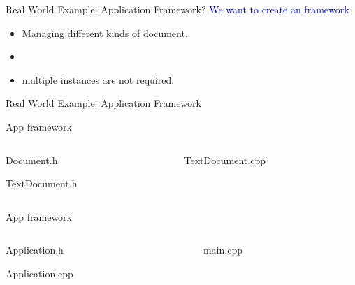 \documentclass[13pt]{beamer}
\begin{document}
\begin{frame}{Real World Example: Application Framework?}
	\textcolor{blue}{We want to create an framework}	
	\begin{itemize}
		\setlength\itemsep{1em}
		\item Managing different kinds of document.
		\item 
		\item multiple instances are not required.
	\end{itemize}
\end{frame}

\begin{frame}{Real World Example: Application Framework}
\begin{center}
\end{center}
\end{frame}

\begin{frame}{App framework}
\begin{columns}[T]
\begin{column}{.45\textwidth}
\lstset{basicstyle=\tiny,style=myCustomCppStyle}
Document.h

TextDocument.h

\end{column}

\begin{column}{.45\textwidth}
\lstset{basicstyle=\tiny,style=myCustomCppStyle}
TextDocument.cpp

\end{column}
\end{columns}
\end{frame}

\begin{frame}{App framework}
\begin{columns}[T]
\begin{column}{.45\textwidth}
\lstset{basicstyle=\tiny,style=myCustomCppStyle}
Application.h

Application.cpp

\end{column}

\begin{column}{.45\textwidth}
\lstset{basicstyle=\tiny,style=myCustomCppStyle}
main.cpp

\end{column}
\end{columns}
\end{frame}
\end{document}
